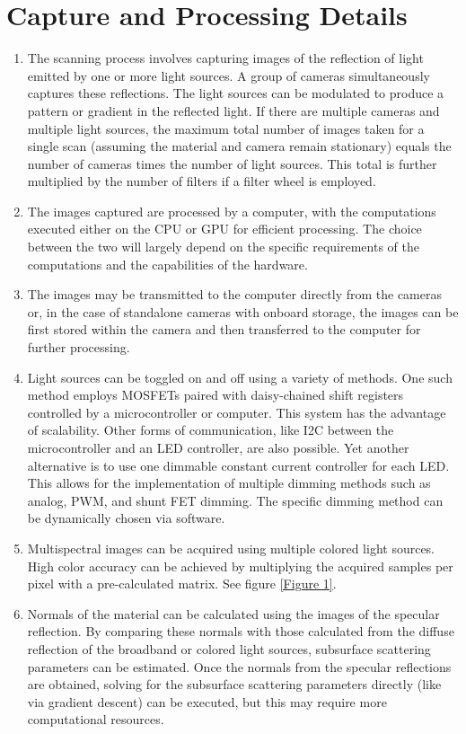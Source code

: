 \documentclass[11pt, twoside, listof=totocnumbered, bibliography=totocnumbered]{scrartcl}
\begin{document}
\section{Capture and Processing Details}

\begin{enumerate}
	\item The scanning process involves capturing images of the reflection of light emitted by one or more light sources. A group of cameras simultaneously captures these reflections. The light sources can be modulated to produce a pattern or gradient in the reflected light. If there are multiple cameras and multiple light sources, the maximum total number of images taken for a single scan (assuming the material and camera remain stationary) equals the number of cameras times the number of light sources. This total is further multiplied by the number of filters if a filter wheel is employed.
	
	\item The images captured are processed by a computer, with the computations executed either on the CPU or GPU for efficient processing. The choice between the two will largely depend on the specific requirements of the computations and the capabilities of the hardware.
	
	\item The images may be transmitted to the computer directly from the cameras or, in the case of standalone cameras with onboard storage, the images can be first stored within the camera and then transferred to the computer for further processing.
	
	\item Light sources can be toggled on and off using a variety of methods. One such method employs MOSFETs paired with daisy-chained shift registers controlled by a microcontroller or computer. This system has the advantage of scalability. Other forms of communication, like I2C between the microcontroller and an LED controller, are also possible. Yet another alternative is to use one dimmable constant current controller for each LED. This allows for the implementation of multiple dimming methods such as analog, PWM, and shunt FET dimming. The specific dimming method can be dynamically chosen via software.
	
	\item Multispectral images can be acquired using multiple colored light sources. High color accuracy can be achieved by multiplying the acquired samples per pixel with a pre-calculated matrix. See figure \ref{Figure 1}.
	
	\item Normals of the material can be calculated using the images of the specular reflection. By comparing these normals with those calculated from the diffuse reflection of the broadband or colored light sources, subsurface scattering parameters can be estimated. Once the normals from the specular reflections are obtained, solving for the subsurface scattering parameters directly (like via gradient descent) can be executed, but this may require more computational resources. \cite{SSS}
\end{enumerate}
\end{document}
